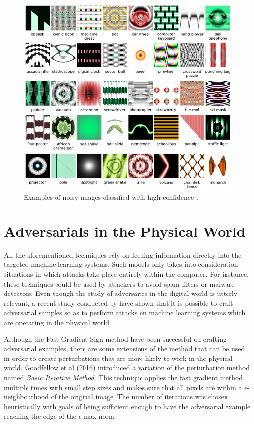 \begin{figure}[!h]
	\centering
	\includegraphics[scale=1.]{unrec_images.png}
	\caption{Examples of noisy images classified with high confidence \cite{nguyen2015}.}
	\label{fig:unrec_images}
\end{figure}


\section{Adversarials in the Physical World}\label{sec:physical}

All the aforementioned techniques rely on feeding information directly into the targeted machine learning systems. Such models only takes into consideration situations in which attacks take place entirely within the computer. For instance, these techniques could be used by attackers to avoid spam filters or malware detectors. Even though the study of adversaries in the digital world is utterly relevant, a recent study conducted by \cite{goodfellow2016} have shown that it is possible to craft adversarial samples so as to perform attacks on machine learning systems which are operating in the physical world.

Although the Fast Gradient Sign method have been successful on crafting adversarial examples, there are some extensions of the method that can be used in order to create perturbations that are more likely to work in the physical world. Goodfellow et al (2016) introduced a variation of the perturbation method named \textit{Basic Iterative Method}. This technique applies the fast gradient method multiple times with small step sizes and makes sure that all pixels are within a $\epsilon$-neighbourhood of the original image. The number of iterations was chosen heuristically with goals of being sufficient enough to have the adversarial example reaching the edge of the $\epsilon$ max-norm.

